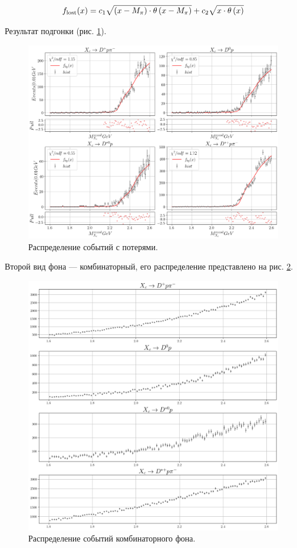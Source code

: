 \begin{equation}
    f_{\text{lost}}(x) = c_1\sqrt{\left( x - M_{\pi} \right) \cdot \theta\left( x - M_{\pi} \right)} + c_2\sqrt{x \cdot \theta\left( x \right)}
\end{equation}

Результат подгонки (рис. \ref{MC_bg_lost_fit}).

\begin{figure}[H]
    \centering
    \includegraphics[width=1\linewidth]{img/MC_sqr_bg_fit.png}
    \caption{Распределение событий с потерями.}
    \label{MC_bg_lost_fit}
\end{figure}

Второй вид фона — комбинаторный, его распределение представлено на рис. \ref{MC_comb}.

\begin{figure}[H]
    \centering
    \includegraphics[width=1\linewidth]{img/MC_comb.png}
    \caption{Распределение событий комбинаторного фона.}
    \label{MC_comb}
\end{figure}

